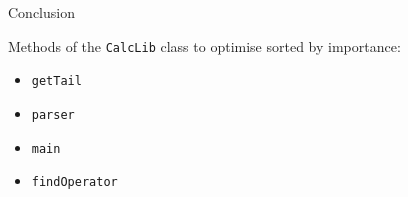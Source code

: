 \documentclass[12pt]{article}
\begin{document}
    \newpage

    \begin{center}
    \LARGE{Conclusion}
    \end{center}

    \bigskip

    \Large{Methods of the \texttt{CalcLib} class to optimise sorted by importance:}
    \large
    \begin{itemize}
      \item \texttt{getTail}
      \item \texttt{parser}
      \item \texttt{main}
      \item \texttt{findOperator}

    \end{itemize}
\end{document}
